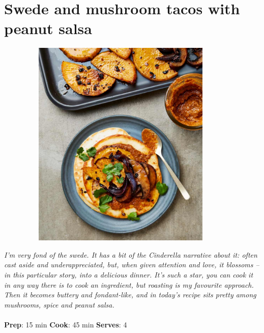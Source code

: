 \documentclass{book}
\begin{document}
\section{Swede and mushroom tacos with peanut salsa}
\begin{figure}
\centering\includegraphics[width=10cm,height=10cm,keepaspectratio]{Recipe_Pictures/Swede_and_mushroom_tacos_with_peanut_salsa.png}
\end{figure}
\emph{I’m very fond of the swede. It has a bit of the Cinderella narrative about it: often cast aside and underappreciated, but, when given attention and love, it blossoms – in this particular story, into a delicious dinner. It’s such a star, you can cook it in any way there is to cook an ingredient, but roasting is my favourite approach. Then it becomes buttery and fondant-like, and in today’s recipe sits pretty among mushrooms, spice and peanut salsa.}\\\\ 
\textbf{Prep}: 15 min
\textbf{Cook}: 45 min
\textbf{Serves}: 4
\end{document}
